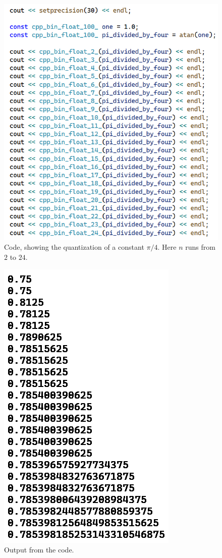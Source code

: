 \documentclass[12pt]{article}
\begin{document}
\pagebreak



\begin{figure} 
\centering
\label{fig7}
  \includegraphics[width = 4 in]{code.png}
  \caption{
Code, showing the quantization of a constant $\pi/4$.
Here $n$ runs from $2$ to $24$.
}
\end{figure}

\begin{figure} 
\centering
\label{fig7}
  \includegraphics[width = 3 in]{code_output.png}
  \caption{
Output from the code.
}
\end{figure}
\end{document}
